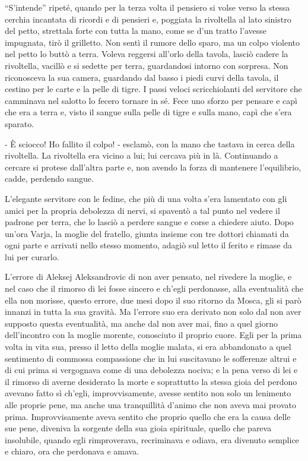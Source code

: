 ``S'intende'' ripeté, quando per la terza volta il pensiero si volse verso la stessa cerchia incantata di ricordi e di pensieri e, poggiata la rivoltella al lato sinistro del petto, strettala forte con tutta la mano, come se d'un tratto l'avesse impugnata, tirò il grilletto. Non sentì il rumore dello sparo, ma un colpo violento nel petto lo buttò a terra. Voleva reggersi all'orlo della tavola, lasciò cadere la rivoltella, vacillò e si sedette per terra, guardandosi intorno con sorpresa. Non riconosceva la sua camera, guardando dal basso i piedi curvi della tavola, il cestino per le carte e la pelle di tigre. I passi veloci scricchiolanti del servitore che camminava nel salotto lo fecero tornare in sé. Fece uno sforzo per pensare e capì che era a terra e, visto il sangue sulla pelle di tigre e sulla mano, capì che s'era sparato. 

- È sciocco! Ho fallito il colpo! - esclamò, con la mano che tastava in cerca della rivoltella. La rivoltella era vicino a lui; lui cercava più in là. Continuando a cercare si protese dall'altra parte e, non avendo la forza di mantenere l'equilibrio, cadde, perdendo sangue. 

L'elegante servitore con le fedine, che più di una volta s'era lamentato con gli amici per la propria debolezza di nervi, si spaventò a tal punto nel vedere il padrone per terra, che lo lasciò a perdere sangue e corse a chiedere aiuto. Dopo un'ora Varja, la moglie del fratello, giunta insieme con tre dottori chiamati da ogni parte e arrivati nello stesso momento, adagiò sul letto il ferito e rimase da lui per curarlo. 

L'errore di Aleksej Aleksandrovic di non aver pensato, nel rivedere la moglie, e nel caso che il rimorso di lei fosse sincero e ch'egli perdonasse, alla eventualità che ella non morisse, questo errore, due mesi dopo il suo ritorno da Mosca, gli si parò innanzi in tutta la sua gravità. Ma l'errore suo era derivato non solo dal non aver supposto questa eventualità, ma anche dal non aver mai, fino a quel giorno dell'incontro con la moglie morente, conosciuto il proprio cuore. Egli per la prima volta in vita sua, presso il letto della moglie malata, si era abbandonato a quel sentimento di commossa compassione che in lui suscitavano le sofferenze altrui e di cui prima si vergognava come di una debolezza nociva; e la pena verso di lei e il rimorso di averne desiderato la morte e soprattutto la stessa gioia del perdono avevano fatto sì ch'egli, improvvisamente, avesse sentito non solo un lenimento alle proprie pene, ma anche una tranquillità d'animo che non aveva mai provato prima. Improvvisamente aveva sentito che proprio quello che era la causa delle sue pene, diveniva la sorgente della sua gioia spirituale, quello che pareva insolubile, quando egli rimproverava, recriminava e odiava, era divenuto semplice e chiaro, ora che perdonava e amava. 

